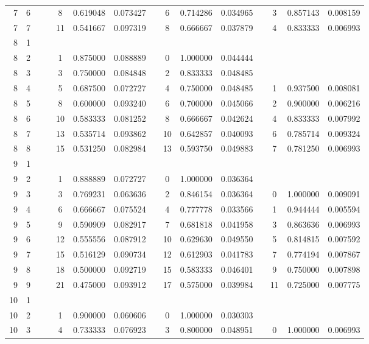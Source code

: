 \begin{appendix}
\begin{longtable}[h]{rrrcccccccccccc}
7	&	6	&&&	8	&	0.619048	&	0.073427	&&	6	&	0.714286	&	0.034965	&&	3	&	0.857143	&	0.008159	\\
7	&	7	&&&	11	&	0.541667	&	0.097319	&&	8	&	0.666667	&	0.037879	&&	4	&	0.833333	&	0.006993	\\
8	&	1	&&&		&		&		&&		&		&		&&		&		&		\\
8	&	2	&&&	1	&	0.875000	&	0.088889	&&	0	&	1.000000	&	0.044444	&&		&		&		\\
8	&	3	&&&	3	&	0.750000	&	0.084848	&&	2	&	0.833333	&	0.048485	&&		&		&		\\
8	&	4	&&&	5	&	0.687500	&	0.072727	&&	4	&	0.750000	&	0.048485	&&	1	&	0.937500	&	0.008081	\\
8	&	5	&&&	8	&	0.600000	&	0.093240	&&	6	&	0.700000	&	0.045066	&&	2	&	0.900000	&	0.006216	\\
8	&	6	&&&	10	&	0.583333	&	0.081252	&&	8	&	0.666667	&	0.042624	&&	4	&	0.833333	&	0.007992	\\
8	&	7	&&&	13	&	0.535714	&	0.093862	&&	10	&	0.642857	&	0.040093	&&	6	&	0.785714	&	0.009324	\\
8	&	8	&&&	15	&	0.531250	&	0.082984	&&	13	&	0.593750	&	0.049883	&&	7	&	0.781250	&	0.006993	\\
9	&	1	&&&		&		&		&&		&		&		&&		&		&		\\
9	&	2	&&&	1	&	0.888889	&	0.072727	&&	0	&	1.000000	&	0.036364	&&		&		&		\\
9	&	3	&&&	3	&	0.769231	&	0.063636	&&	2	&	0.846154	&	0.036364	&&	0	&	1.000000	&	0.009091	\\
9	&	4	&&&	6	&	0.666667	&	0.075524	&&	4	&	0.777778	&	0.033566	&&	1	&	0.944444	&	0.005594	\\
9	&	5	&&&	9	&	0.590909	&	0.082917	&&	7	&	0.681818	&	0.041958	&&	3	&	0.863636	&	0.006993	\\
9	&	6	&&&	12	&	0.555556	&	0.087912	&&	10	&	0.629630	&	0.049550	&&	5	&	0.814815	&	0.007592	\\
9	&	7	&&&	15	&	0.516129	&	0.090734	&&	12	&	0.612903	&	0.041783	&&	7	&	0.774194	&	0.007867	\\
9	&	8	&&&	18	&	0.500000	&	0.092719	&&	15	&	0.583333	&	0.046401	&&	9	&	0.750000	&	0.007898	\\
9	&	9	&&&	21	&	0.475000	&	0.093912	&&	17	&	0.575000	&	0.039984	&&	11	&	0.725000	&	0.007775	\\
10	&	1	&&&		&		&		&&		&		&		&&		&		&		\\
10	&	2	&&&	1	&	0.900000	&	0.060606	&&	0	&	1.000000	&	0.030303	&&		&		&		\\
10	&	3	&&&	4	&	0.733333	&	0.076923	&&	3	&	0.800000	&	0.048951	&&	0	&	1.000000	&	0.006993	\\

\end{longtable}
\end{appendix}
